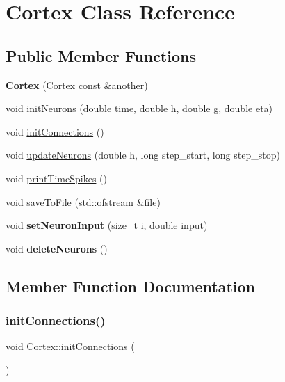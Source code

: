 \hypertarget{classCortex}{}\section{Cortex Class Reference}
\label{classCortex}
\subsection*{Public Member Functions}
\begin{DoxyCompactItemize}
\item 
\mbox{\label{classCortex_ae3641e73ba7f598d43bc6f75f987b4fd}} 
{\bfseries Cortex} (\hyperlink{classCortex}{Cortex} const \&another)
\item 
void \hyperlink{classCortex_a8bb28e0c377f760af36db4114c29a519}{init\+Neurons} (double time, double h, double g, double eta)
\item 
void \hyperlink{classCortex_a65acfddf2eb9c9877fd7f947ed47c655}{init\+Connections} ()
\item 
void \hyperlink{classCortex_a17e7aeb919c1c567c0cc07334487db11}{update\+Neurons} (double h, long step\+\_\+start, long step\+\_\+stop)
\item 
void \hyperlink{classCortex_a2025c7e3493b8e740ee8de135e414522}{print\+Time\+Spikes} ()
\item 
void \hyperlink{classCortex_a9f01f06ef18c8632606f3425083850c3}{save\+To\+File} (std\+::ofstream \&file)
\item 
\mbox{\label{classCortex_aec2f3529599592c24c1479f18359f422}} 
void {\bfseries set\+Neuron\+Input} (size\+\_\+t i, double input)
\item 
\mbox{\label{classCortex_ac1a24c99cc119463aa4c260be2e6bfc6}} 
void {\bfseries delete\+Neurons} ()
\end{DoxyCompactItemize}


\subsection{Member Function Documentation}
\mbox{\label{classCortex_a65acfddf2eb9c9877fd7f947ed47c655}} 
\subsubsection{\texorpdfstring{init\+Connections()}{initConnections()}}
{\footnotesize\ttfamily void Cortex\+::init\+Connections (\begin{DoxyParamCaption}{ }\end{DoxyParamCaption})}

